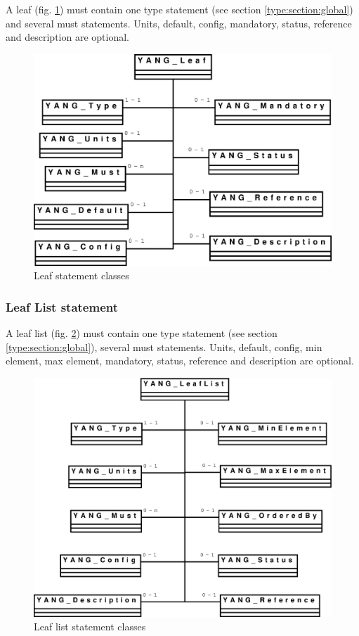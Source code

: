 \documentclass[a4paper]{article}
\begin{document}
A leaf (fig. \ref{leaf}) must  contain one type statement (see section
\ref{type:section:global})   and  several  must   statements.   Units,
default,  config,  mandatory, status,  reference  and description  are
optional.
\begin{figure}[htbp]
\begin{center}
\includegraphics[scale = .3]{leaf.eps}
\end{center}
\caption{Leaf statement classes}
\label{leaf}
\end{figure}

\subsubsection{Leaf List statement}

A  leaf list (fig.   \ref{leaflist}) must  contain one  type statement
(see  section  \ref{type:section:global}),  several  must  statements.
Units, default,  config, min element, max  element, mandatory, status,
reference and description are optional.
\begin{figure}[htbp]
\begin{center}
\includegraphics[scale = .3]{leaflist.eps}
\end{center}
\caption{Leaf list statement classes}
\label{leaflist}
\end{figure}
\end{document}
